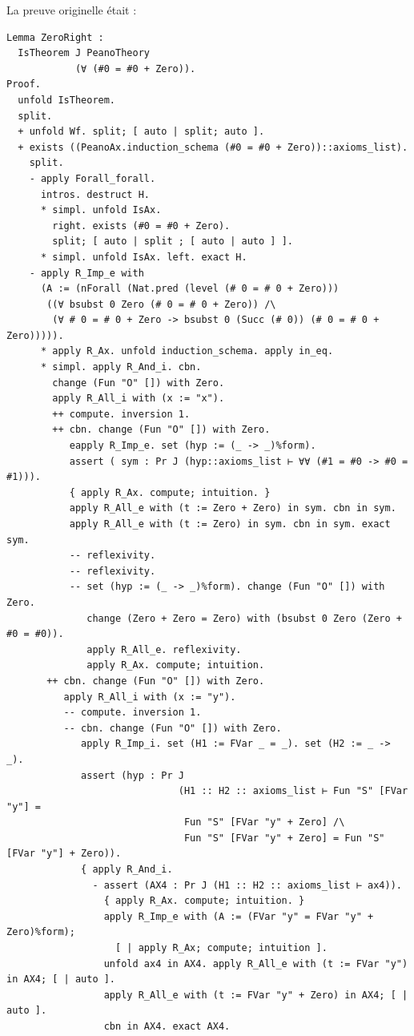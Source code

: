 \documentclass[a4paper]{article}
\begin{document}
La preuve originelle était :
\begin{verbatim}
Lemma ZeroRight :
  IsTheorem J PeanoTheory
            (∀ (#0 = #0 + Zero)).
Proof.
  unfold IsTheorem.
  split.
  + unfold Wf. split; [ auto | split; auto ].
  + exists ((PeanoAx.induction_schema (#0 = #0 + Zero))::axioms_list).
    split.
    - apply Forall_forall.
      intros. destruct H.
      * simpl. unfold IsAx.
        right. exists (#0 = #0 + Zero).
        split; [ auto | split ; [ auto | auto ] ].
      * simpl. unfold IsAx. left. exact H.
    - apply R_Imp_e with
      (A := (nForall (Nat.pred (level (# 0 = # 0 + Zero)))
       ((∀ bsubst 0 Zero (# 0 = # 0 + Zero)) /\
        (∀ # 0 = # 0 + Zero -> bsubst 0 (Succ (# 0)) (# 0 = # 0 + Zero))))).
      * apply R_Ax. unfold induction_schema. apply in_eq.
      * simpl. apply R_And_i. cbn.
        change (Fun "O" []) with Zero.
        apply R_All_i with (x := "x").
        ++ compute. inversion 1.
        ++ cbn. change (Fun "O" []) with Zero.
           eapply R_Imp_e. set (hyp := (_ -> _)%form).
           assert ( sym : Pr J (hyp::axioms_list ⊢ ∀∀ (#1 = #0 -> #0 = #1))).
           { apply R_Ax. compute; intuition. }
           apply R_All_e with (t := Zero + Zero) in sym. cbn in sym.
           apply R_All_e with (t := Zero) in sym. cbn in sym. exact sym.
           -- reflexivity.
           -- reflexivity.
           -- set (hyp := (_ -> _)%form). change (Fun "O" []) with Zero.
              change (Zero + Zero = Zero) with (bsubst 0 Zero (Zero + #0 = #0)).
              apply R_All_e. reflexivity.
              apply R_Ax. compute; intuition.
       ++ cbn. change (Fun "O" []) with Zero.
          apply R_All_i with (x := "y").
          -- compute. inversion 1.
          -- cbn. change (Fun "O" []) with Zero.
             apply R_Imp_i. set (H1 := FVar _ = _). set (H2 := _ -> _).
             assert (hyp : Pr J
                              (H1 :: H2 :: axioms_list ⊢ Fun "S" [FVar "y"] =
                               Fun "S" [FVar "y" + Zero] /\
                               Fun "S" [FVar "y" + Zero] = Fun "S" [FVar "y"] + Zero)).
             { apply R_And_i.
               - assert (AX4 : Pr J (H1 :: H2 :: axioms_list ⊢ ax4)).
                 { apply R_Ax. compute; intuition. }
                 apply R_Imp_e with (A := (FVar "y" = FVar "y" + Zero)%form);
                   [ | apply R_Ax; compute; intuition ].
                 unfold ax4 in AX4. apply R_All_e with (t := FVar "y") in AX4; [ | auto ].
                 apply R_All_e with (t := FVar "y" + Zero) in AX4; [ | auto ].
                 cbn in AX4. exact AX4. 

\end{verbatim}
\end{document}
